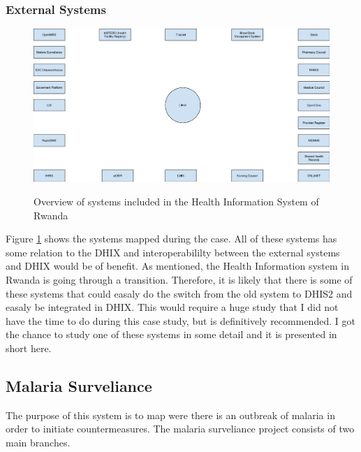 \subsubsection{External Systems}
\begin{figure}
\centering
\includegraphics[width=12cm]{empirical/images/context}
\label{fig:context_systems}
\caption{Overview of systems included in the Health Information System of Rwanda}
\end{figure}
Figure \ref{fig:context_systems} shows the systems mapped during the case.
All of these systems has some relation to the DHIX and interoperabililty between the external systems and DHIX would be of benefit.
As mentioned, the Health Information system in Rwanda is going through a transition. 
Therefore, it is likely that there is some of these systems that could easaly do the switch from the old system to DHIS2 and easaly be integrated in DHIX.
This would require a huge study that I did not have the time to do during this case study, but is definitively recommended.  
I got the chance to study one of these systems in some detail and it is presented in short here. 
\subsection{Malaria Surveliance}
The purpose of this system is to map were there is an outbreak of malaria in order to initiate countermeasures.
The malaria surveliance project consists of two main branches. 
